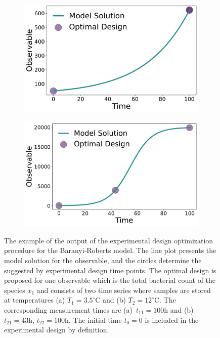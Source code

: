 \documentclass[graybox]{svmult}
\begin{document}
\begin{figure}[H]
    \begin{subfigure}{.5\textwidth}
        \centering
        \includegraphics[scale=0.255]{Figures/Fig3a.pdf}
    \end{subfigure}
    \begin{subfigure}{.5\textwidth}
        \centering
        \includegraphics[scale=0.255]{Figures/Fig3b.pdf}
    \end{subfigure}
    \caption{The example of the output of the experimental design optimization procedure for the Baranyi-Roberts model.
    The line plot presents the model solution for the observable, and the circles determine the suggested by experimental design time points.
    The optimal design is proposed for one observable which is the total bacterial count of the species $x_1$ and consists of two time series where samples are stored at temperatures (a) $T_1 = 3.5^\circ$C and (b) $T_2 = 12^\circ$C.
    The corresponding measurement times are (a)~$t_{11}=100$h and (b)~$t_{21}=43$h, $t_{22}=100$h.
    The initial time $t_0=0$ is included in the experimental design by definition.}
    \label{Fig3}
\end{figure}
\end{document}
